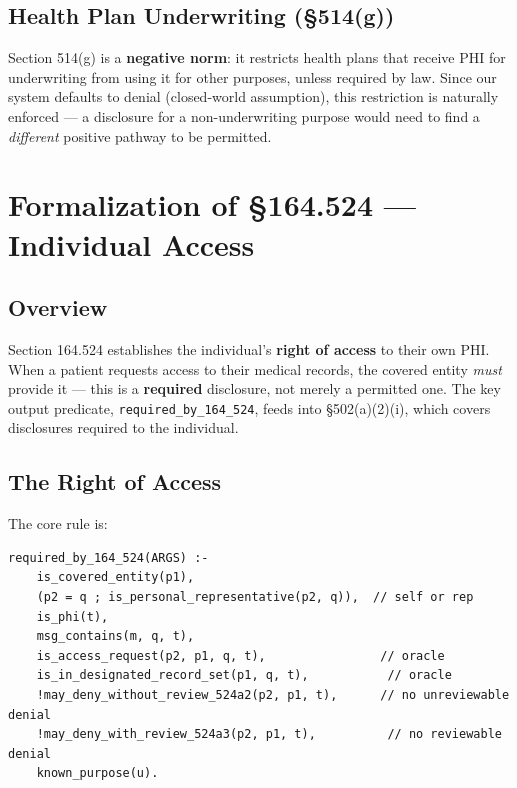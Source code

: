 \documentclass[11pt,letterpaper]{article}
\begin{document}
\subsection{Health Plan Underwriting (\S 514(g))}

Section 514(g) is a \textbf{negative norm}: it restricts health plans that receive PHI for underwriting from using it for other purposes, unless required by law. Since our system defaults to denial (closed-world assumption), this restriction is naturally enforced --- a disclosure for a non-underwriting purpose would need to find a \emph{different} positive pathway to be permitted.


\section{Formalization of \S 164.524 --- Individual Access}
\label{sec:524}

\subsection{Overview}

Section 164.524 establishes the individual's \textbf{right of access} to their own PHI. When a patient requests access to their medical records, the covered entity \emph{must} provide it --- this is a \textbf{required} disclosure, not merely a permitted one. The key output predicate, \texttt{required\_by\_164\_524}, feeds into \S 502(a)(2)(i), which covers disclosures required to the individual.

\subsection{The Right of Access}

The core rule is:

\begin{lstlisting}[style=soufflestyle,caption={Right of access (\S 524) --- from hipaa\_164\_524.dl}]
required_by_164_524(ARGS) :-
    is_covered_entity(p1),
    (p2 = q ; is_personal_representative(p2, q)),  // self or rep
    is_phi(t),
    msg_contains(m, q, t),
    is_access_request(p2, p1, q, t),                // oracle
    is_in_designated_record_set(p1, q, t),           // oracle
    !may_deny_without_review_524a2(p2, p1, t),      // no unreviewable denial
    !may_deny_with_review_524a3(p2, p1, t),          // no reviewable denial
    known_purpose(u).
\end{lstlisting}
\end{document}
